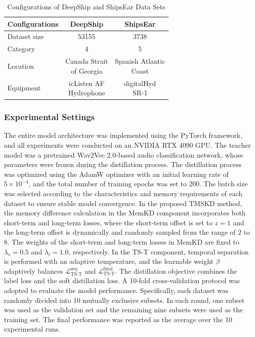 ﻿\documentclass[lettersize,journal]{IEEEtran}
\begin{document}
\begin{table}[htbp]
\centering
\caption{Configurations of DeepShip and ShipsEar Data Sets}
\label{tab:dataset}
\renewcommand{\arraystretch}{1.1} 
\setlength{\tabcolsep}{10pt} 

\begin{tabular}{@{}lcc@{}} 
\toprule
Configurations & DeepShip & ShipsEar \\
\midrule
Dataset size & 53155 & 3738 \\
Category     & 4     & 5    \\
Location     & \makecell[c]{Canada Strait \\ of Georgia} & \makecell[c]{Spanish Atlantic \\ Coast} \\
Equipment    & \makecell[c]{icListen AF \\ Hydrophone}   & \makecell[c]{digitalHyd \\ SR-1} \\
\bottomrule
\end{tabular}
\end{table}

\subsubsection{Experimental Settings}
The entire model architecture was implemented using the PyTorch framework, and all experiments were conducted on an NVIDIA RTX 4090 GPU. The teacher model was a pretrained Wav2Vec 2.0-based audio classification network, whose parameters were frozen during the distillation process.
The distillation process was optimized using the AdamW optimizer with an initial learning rate of $5\times10^{-4}$, and the total number of training epochs was set to 200. The batch size was selected according to the characteristics and memory requirements of each dataset to ensure stable model convergence.
In the proposed TMSKD method, the memory difference calculation in the MemKD component incorporates both short-term and long-term losses, where the short-term offset is set to $z=1$ and the long-term offset is dynamically and randomly sampled from the range of $2$ to $8$. The weights of the short-term and long-term losses in MemKD are fixed to $\lambda_s=0.5$ and $\lambda_l=1.0$, respectively. In the TS-T component, temporal separation is performed with an adaptive temperature, and the learnable weight $\beta$ adaptively balances $\mathcal{L}_{\mathrm{TS\mbox{-}T}}^{\mathrm{seq}}$ and $\mathcal{L}_{\mathrm{TS\mbox{-}T}}^{\mathrm{final}}$.
The distillation objective combines the label loss and the soft distillation loss. A 10-fold cross-validation protocol was adopted to evaluate the model performance. Specifically, each dataset was randomly divided into 10 mutually exclusive subsets. In each round, one subset was used as the validation set and the remaining nine subsets were used as the training set. The final performance was reported as the average over the 10 experimental runs.
\end{document}
